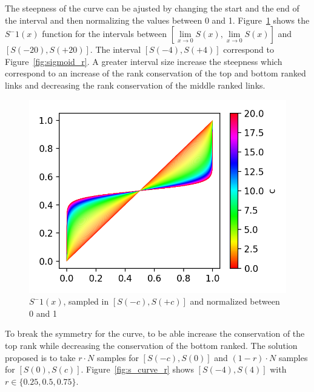 The steepness of the curve can be ajusted by changing the start and the end of the interval and then normalizing the values between 0 and 1. Figure~\ref{fig:s_curve_c} shows the $S^-1(x)$ function for the intervals between $\left[\lim\limits_{x \rightarrow 0}S(x), \lim\limits_{x \rightarrow 0}S(x)\right]$ and $\left[S(-20), S(+20)\right]$. The interval $\left[S(-4), S(+4)\right]$ correspond to Figure~\ref{fig:sigmoid_r}.
A greater interval size increase the steepness which correspond to an increase of the rank conservation of the top and bottom ranked links and decreasing the rank conservation of the middle ranked links.

\begin{figure}
  \centering
  \includegraphics[width=\linewidth]{img/s_curve_c.png}
  \caption{$S^-1(x)$, sampled in $\left[S(-c), S(+c)\right]$ and normalized between 0 and 1}
  \label{fig:s_curve_c}
\end{figure}

To break the symmetry for the curve, to be able increase the conservation of the top rank while decreasing the conservation of the bottom ranked. The solution proposed is to take $r \cdot N$ samples for $\left[S(-c), S(0)\right]$ and $(1-r) \cdot N$ samples for $\left[S(0), S(c)\right]$. Figure~\ref{fig:s_curve_r} shows $\left[S(-4), S(4)\right]$ with $r \in \{0.25, 0.5, 0.75\}$.

